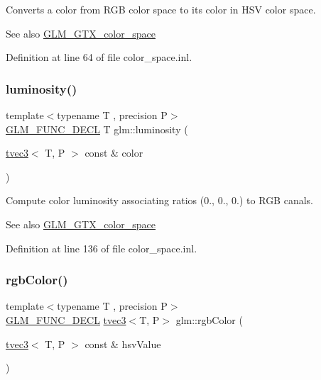 Converts a color from R\+GB color space to its color in H\+SV color space. \begin{DoxySeeAlso}{See also}
\mbox{\hyperlink{group__gtx__color__space}{G\+L\+M\+\_\+\+G\+T\+X\+\_\+color\+\_\+space}} 
\end{DoxySeeAlso}


Definition at line 64 of file color\+\_\+space.\+inl.

\mbox{\label{group__gtx__color__space_gaa2f38a5100c3e1c7d39920df43bd8cbe}} 
\subsubsection{\texorpdfstring{luminosity()}{luminosity()}}
{\footnotesize\ttfamily template$<$typename T , precision P$>$ \\
\mbox{\hyperlink{setup_8hpp_ab2d052de21a70539923e9bcbf6e83a51}{G\+L\+M\+\_\+\+F\+U\+N\+C\+\_\+\+D\+E\+CL}} T glm\+::luminosity (\begin{DoxyParamCaption}\item[{\mbox{\hyperlink{structglm_1_1tvec3}{tvec3}}$<$ T, P $>$ const \&}]{color }\end{DoxyParamCaption})}

Compute color luminosity associating ratios (0., 0., 0.) to R\+GB canals. \begin{DoxySeeAlso}{See also}
\mbox{\hyperlink{group__gtx__color__space}{G\+L\+M\+\_\+\+G\+T\+X\+\_\+color\+\_\+space}} 
\end{DoxySeeAlso}


Definition at line 136 of file color\+\_\+space.\+inl.

\mbox{\label{group__gtx__color__space_ga36b0619e31daf57bc4a54dac2dcf34b7}} 
\subsubsection{\texorpdfstring{rgbColor()}{rgbColor()}}
{\footnotesize\ttfamily template$<$typename T , precision P$>$ \\
\mbox{\hyperlink{setup_8hpp_ab2d052de21a70539923e9bcbf6e83a51}{G\+L\+M\+\_\+\+F\+U\+N\+C\+\_\+\+D\+E\+CL}} \mbox{\hyperlink{structglm_1_1tvec3}{tvec3}}$<$T, P$>$ glm\+::rgb\+Color (\begin{DoxyParamCaption}\item[{\mbox{\hyperlink{structglm_1_1tvec3}{tvec3}}$<$ T, P $>$ const \&}]{hsv\+Value }\end{DoxyParamCaption})}

